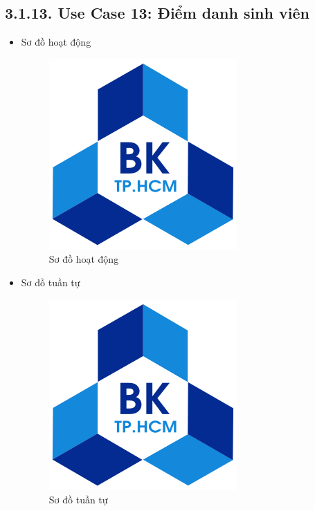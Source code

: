 \subsection*{3.1.13. Use Case 13: Điểm danh sinh viên}
\begin{itemize}
    \item Sơ đồ hoạt động
    \begin{figure}[H]
    \centering
    \includegraphics[scale=0.5 ]{Picture/hcmut.png}
    \caption{Sơ đồ hoạt động }
    \end{figure}
    \item Sơ đồ tuần tự
    \begin{figure}[H]
    \centering
    \includegraphics[scale=0.5 ]{Picture/hcmut.png}
    \caption{Sơ đồ tuần tự }
    \end{figure}
\end{itemize}
